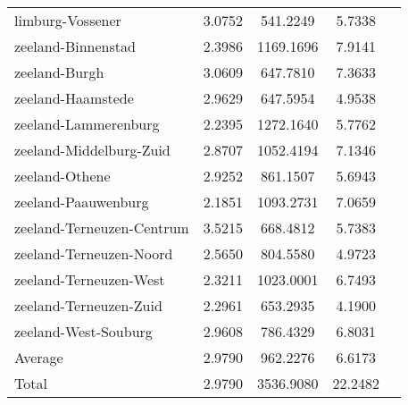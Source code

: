 \begin{longtable}{llccc}
limburg-Vossener & 3.0752 & 541.2249 & 5.7338 \\
zeeland-Binnenstad & 2.3986 & 1169.1696 & 7.9141 \\
zeeland-Burgh & 3.0609 & 647.7810 & 7.3633 \\
zeeland-Haamstede & 2.9629 & 647.5954 & 4.9538 \\
zeeland-Lammerenburg & 2.2395 & 1272.1640 & 5.7762 \\
zeeland-Middelburg-Zuid & 2.8707 & 1052.4194 & 7.1346 \\
zeeland-Othene & 2.9252 & 861.1507 & 5.6943 \\
zeeland-Paauwenburg & 2.1851 & 1093.2731 & 7.0659 \\
zeeland-Terneuzen-Centrum & 3.5215 & 668.4812 & 5.7383 \\
zeeland-Terneuzen-Noord & 2.5650 & 804.5580 & 4.9723 \\
zeeland-Terneuzen-West & 2.3211 & 1023.0001 & 6.7493 \\
zeeland-Terneuzen-Zuid & 2.2961 & 653.2935 & 4.1900 \\
zeeland-West-Souburg & 2.9608 & 786.4329 & 6.8031 \\
Average & 2.9790 & 962.2276 & 6.6173 \\
Total & 2.9790 & 3536.9080 & 22.2482 \\
\hline
\end{longtable}
